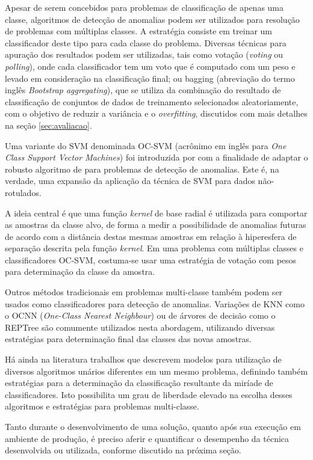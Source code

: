 Apesar de serem concebidos para problemas de classificação de apenas uma classe, algoritmos de detecção de anomalias podem ser utilizados para resolução de problemas com múltiplas classes. A estratégia consiste em treinar um classificador deste tipo para cada classe do problema. Diversas técnicas para apuração dos resultados podem ser utilizadas, tais como votação (\textit{voting} ou \textit{polling}), onde cada classificador tem um voto que é computado com um peso e levado em consideração na classificação final; ou bagging (abreviação do termo inglês \textit{Bootstrap aggregating}), que se utiliza da combinação do resultado de classificação de conjuntos de dados de treinamento selecionados aleatoriamente, com o objetivo de reduzir a variância e o \textit{overfitting}, discutidos com mais detalhes na seção \ref{sec:avaliacao}.

Uma variante do SVM denominada OC-SVM (acrônimo em inglês para \textit{One Class Support Vector Machines}) foi introduzida por  com a finalidade de adaptar o robusto algoritmo de  para problemas de detecção de anomalias. Este é, na verdade, uma expansão da aplicação da técnica de SVM para dados não-rotulados.

A ideia central é que uma função \textit{kernel} de base radial é utilizada para comportar as amostras da classe alvo, de forma a medir a possibilidade de anomalias futuras de acordo com a distância destas mesmas amostras em relação à hiperesfera de separação descrita pela função \textit{kernel}. Em uma problema com múltiplas classes e classificadores OC-SVM, costuma-se usar uma estratégia de votação com pesos para determinação da classe da amostra.

Outros métodos tradicionais em problemas multi-classe também podem ser usados como classificadores para detecção de anomalias. Variações de KNN como o OCNN (\textit{One-Class Nearest Neighbour}) ou de árvores de decisão como o REPTree são comumente utilizados nesta abordagem, utilizando diversas estratégias para determinação final das classes das novas amostras.

Há ainda na literatura trabalhos que descrevem modelos para utilização de diversos algoritmos unários diferentes em um mesmo problema, definindo também estratégias para a determinação da classificação resultante da miríade de classificadores. Isto possibilita um grau de liberdade elevado na escolha desses algoritmos e estratégias para problemas multi-classe.

Tanto durante o desenvolvimento de uma solução, quanto após sua execução em ambiente de produção, é preciso aferir e quantificar o desempenho da técnica desenvolvida ou utilizada, conforme discutido na próxima seção.

